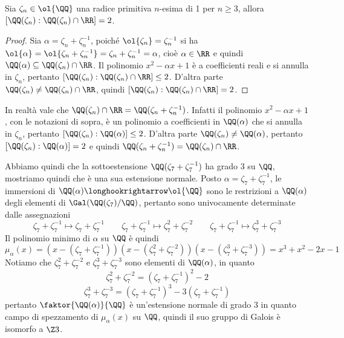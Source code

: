 \documentclass[11pt]{scrartcl}
\begin{document}
	\begin{proposition}
		Sia $\zeta_n \in \ol{\QQ}$ una radice primitiva $n$-esima di 1 per $n \geq 3$,
		allora $[\QQ(\zeta_n):\QQ(\zeta_n)\cap \RR] = 2$.
	\end{proposition}
	
	\begin{proof}
		Sia $\alpha = \zeta_n + \zeta_n^{-1}$, poiché $\ol{\zeta_n} = \zeta_n^{-1}$
		si ha $\ol{\alpha} = \ol{\zeta_n + \zeta_n^{-1}} = \zeta_n + \zeta_n^{-1} = \alpha$,
		cioè $\alpha \in \RR$ e quindi $\QQ(\alpha) \subseteq \QQ(\zeta_n)\cap \RR$.
		Il polinomio $x^2 - \alpha x + 1$ è a coefficienti reali e si annulla in 
		$\zeta_n$, pertanto $[\QQ(\zeta_n):\QQ(\zeta_n)\cap \RR]\leq 2$. D'altra
		parte $\QQ(\zeta_n)\neq \QQ(\zeta_n)\cap \RR$, quindi 
		$[\QQ(\zeta_n):\QQ(\zeta_n)\cap \RR] = 2$.
	\end{proof}
	
	\begin{remark}
		In realtà vale che $\QQ(\zeta_n)\cap \RR = \QQ(\zeta_n + \zeta_n^{-1})$.
		Infatti il polinomio $x^2 - \alpha x + 1$, con le notazioni di sopra, 
		è un polinomio a coefficienti in $\QQ(\alpha)$ che si annulla in $\zeta_n$,
		pertanto $[\QQ(\zeta_n):\QQ(\alpha)] \leq 2$. D'altra parte $\QQ(\zeta_n)\neq \QQ(\alpha)$,
		pertanto $[\QQ(\zeta_n):\QQ(\alpha)] = 2$ e quindi 
		$\QQ(\zeta_n + \zeta_n^{-1}) = \QQ(\zeta_n)\cap \RR$.
	\end{remark}
	
	Abbiamo quindi che la sottoestensione $\QQ(\zeta_7 + \zeta_7^{-1})$ ha grado
	3 su $\QQ$, mostriamo quindi che è una sua estensione normale. Posto 
	$\alpha = \zeta_7 + \zeta_7^{-1}$, le immersioni di 
	$\QQ(\alpha) \longhookrightarrow \ol{\QQ}$ sono le restrizioni a $\QQ(\alpha)$
	degli elementi di $\Gal(\QQ(\zeta_7)/\QQ)$, pertanto sono univocamente determinate
	dalle assegnazioni 
	\[
	\zeta_7 + \zeta_7^{-1} \longmapsto \zeta_7 + \zeta_7^{-1}\qquad
	\zeta_7 + \zeta_7^{-1} \longmapsto \zeta_7^2 + \zeta_7^{-2}\qquad
	\zeta_7 + \zeta_7^{-1} \longmapsto \zeta_7^3 + \zeta_7^{-3}
	\]
	Il polinomio minimo di $\alpha$ su $\QQ$ è quindi 
	\[
	\mu_{\alpha}(x) = (x - (\zeta_7 + \zeta_7^{-1}))(x - (\zeta_7^2 + \zeta_7^{-2}))(x - (\zeta_7^3 + \zeta_7^{-3}))
	= x^3 + x^2 - 2x - 1
	\]
	Notiamo che $\zeta_7^2 + \zeta_7^{-2}$ e $\zeta_7^3 + \zeta_7^{-3}$ sono
	elementi di $\QQ(\alpha)$, in quanto
	\[
	\zeta_7^2 + \zeta_7^{-2} = (\zeta_7 + \zeta_7^{-1})^2 - 2
	\]
	\[
	\zeta_7^3 + \zeta_7^{-3} = (\zeta_7 + \zeta_7^{-1})^3 - 3(\zeta_7 + \zeta_7^{-1})
	\]
	pertanto $\faktor{\QQ(\alpha)}{\QQ}$ è un'estensione normale di grado 3 in 
	quanto campo di spezzamento di $\mu_{\alpha}(x)$ su $\QQ$,
	quindi il suo gruppo di Galois è isomorfo a $\Z3$.
	
\end{document}
